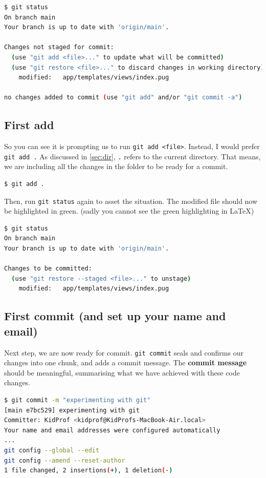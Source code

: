 \begin{lstlisting}[language=bash]
$ git status
On branch main
Your branch is up to date with 'origin/main'.

Changes not staged for commit:
  (use "git add <file>..." to update what will be committed)
  (use "git restore <file>..." to discard changes in working directory)
	modified:   app/templates/views/index.pug

no changes added to commit (use "git add" and/or "git commit -a")
\end{lstlisting}

\subsection*{First add}
So you can see it is prompting us to run \texttt{git add <file>}. Instead, I would prefer \texttt{git add .} As discussed in \cref{sec:dir}, \texttt{.} refers to the current directory. That means, we are including all the changes in the folder to be ready for a commit.

\begin{lstlisting}[language=bash]
$ git add .
\end{lstlisting}

Then, run \texttt{git status} again to asset the situation. The modified file should now be highlighted in green. (sadly you cannot see the green highlighting in \LaTeX)

\begin{lstlisting}[language=bash]
$ git status
On branch main
Your branch is up to date with 'origin/main'.

Changes to be committed:
  (use "git restore --staged <file>..." to unstage)
	modified:   app/templates/views/index.pug
\end{lstlisting}

\subsection*{First commit (and set up your name and email)}

Next step, we are now ready for commit. \texttt{git commit} seals and confirms our changes into one chunk, and adds a commit message. The \textbf{commit message} should be meaningful, summarising what we have achieved with these code changes.

\begin{lstlisting}[language=bash]
$ git commit -m "experimenting with git"
[main e7bc529] experimenting with git
Committer: KidProf <kidprof@KidProfs-MacBook-Air.local>
Your name and email addresses were configured automatically
...
git config --global --edit
git config --amend --reset-author
1 file changed, 2 insertions(+), 1 deletion(-)
\end{lstlisting}

